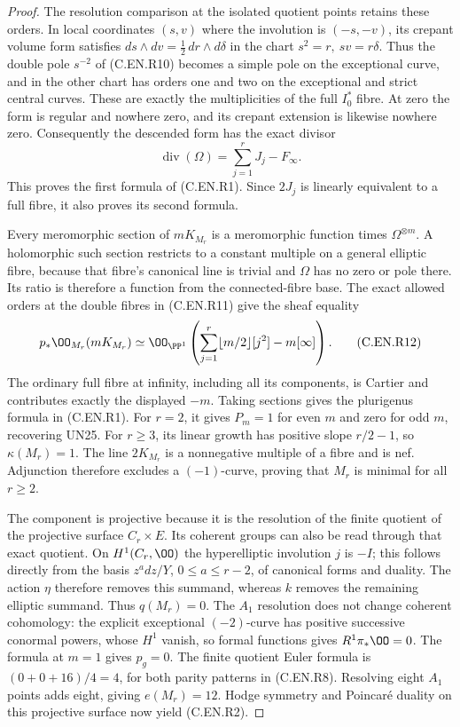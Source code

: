 \begin{proof}
The resolution comparison at the isolated
quotient points retains these orders.
In local coordinates $(s,v)$ where the
involution is $(-s,-v)$, its crepant
volume form satisfies
$ds\wedge dv=\tfrac12\,dr\wedge d\delta$
in the chart $s^2=r,\ sv=r\delta$.
Thus the double pole $s^{-2}$ of
(C.EN.R10) becomes a simple pole
on the exceptional curve, and in the
other chart has orders one and two
on the exceptional and strict central
curves. These are exactly the
multiplicities of the full $I_0^*$
fibre. At zero the form is regular
and nowhere zero, and its crepant
extension is likewise nowhere zero.
Consequently the descended form has
the exact divisor
\[
                \operatorname{div}(\Omega)
                         =\sum_{j=1}^r J_j-F_\infty.
                                                               \tag{C.EN.R11}
\]
This proves the first formula of
(C.EN.R1). Since $2J_j$ is linearly
equivalent to a full fibre, it also
proves its second formula.

Every meromorphic section of $mK_{M_r}$
is a meromorphic function times
$\Omega^{\otimes m}$. A holomorphic
such section restricts to a constant
multiple on a general elliptic fibre,
because that fibre's canonical line
is trivial and $\Omega$ has no zero
or pole there. Its ratio is therefore
a function from the connected-fibre
base. The exact allowed orders at
the double fibres in (C.EN.R11)
give the sheaf equality
\[
 p_*\OO_{M_r}(mK_{M_r})
  \simeq
 \OO_{\PP^1}\left(
      \sum_{j=1}^r\lfloor m/2\rfloor[j^2]
                       -m[\infty]\right).
                                                               \tag{C.EN.R12}
\]
The ordinary full fibre at infinity,
including all its components, is
Cartier and contributes exactly the
displayed $-m$. Taking sections gives
the plurigenus formula in (C.EN.R1).
For $r=2$, it gives $P_m=1$ for even
$m$ and zero for odd $m$, recovering
UN25. For $r\ge3$, its linear growth
has positive slope $r/2-1$, so
$\kappa(M_r)=1$. The line $2K_{M_r}$
is a nonnegative multiple of a fibre
and is nef. Adjunction therefore
excludes a $(-1)$-curve, proving that
$M_r$ is minimal for all $r\ge2$.

The component is projective because
it is the resolution of the finite
quotient of the projective surface
$C_r\times E$. Its coherent groups
can also be read through that exact
quotient. On $H^1(C_r,\OO)$ the
hyperelliptic involution $j$ is
$-I$; this follows directly from
the basis $z^a dz/Y$, $0\le a\le r-2$,
of canonical forms and duality.
The action $\eta$ therefore removes
this summand, whereas $k$ removes
the remaining elliptic summand.
Thus $q(M_r)=0$. The $A_1$ resolution
does not change coherent cohomology:
the explicit exceptional $(-2)$-curve
has positive successive conormal
powers, whose $H^1$ vanish, so
formal functions gives $R^1\pi_*\OO=0$.
The formula at $m=1$ gives $p_g=0$.
The finite quotient Euler formula is
$(0+0+16)/4=4$, for both parity
patterns in (C.EN.R8). Resolving
eight $A_1$ points adds eight,
giving $e(M_r)=12$. Hodge symmetry
and Poincar\'e duality on this
projective surface now yield
(C.EN.R2).


\end{proof}
